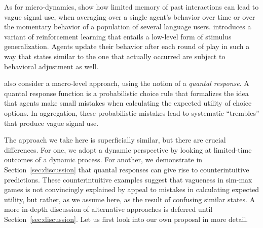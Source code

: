 As for micro-dynamics, \citet{FrankeJager2010:Vagueness-Signa} show
how limited memory of past interactions can lead to vague signal use,
when averaging over a single agent's behavior over time or over the
momentary behavior of a population of several language
users. \citet{OConnor2013:The-Evolution-o} introduces a variant of
reinforcement learning that entails a low-level form of stimulus
generalization. Agents update their behavior after each round of play
in such a way that states similar to the one that actually occurred
are subject to behavioral adjustment as well.

\citet{FrankeJager2010:Vagueness-Signa} also consider a macro-level
approach, using the notion of a \emph{quantal response}. A quantal
response function is a probabilistic choice rule that formalizes the
idea that agents make small mistakes when calculating the expected
utility of choice options. In aggregation, these probabilistic
mistakes lead to systematic ``trembles'' that produce vague signal
use.

The approach we take here is superficially similar, but there are
crucial differences. For one, we adopt a dynamic perspective by
looking at limited-time outcomes of a dynamic process. For another, we
demonstrate in Section~\ref{sec:discussion} that quantal responses can
give rise to counterintuitive predictions. These counterintuitive
examples suggest that vagueness in sim-max games is not convincingly
explained by appeal to mistakes in calculating expected utility, but
rather, as we assume here, as the result of confusing similar
states. A more in-depth discussion of alternative approaches is deferred until
Section~\ref{sec:discussion}.
Let us first look into our own proposal in more detail.






